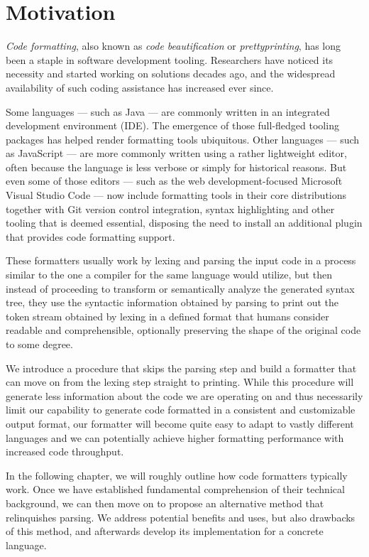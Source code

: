 \chapter{Motivation}
\textit{Code formatting}, also known as \textit{code beautification} or \textit{prettyprinting},
has long been a staple in software development tooling.
Researchers have noticed its necessity and started working on solutions decades ago,
\autocite{syntaxDirectedPrettyprinting}
and the widespread availability of such coding assistance has increased ever since.

Some languages --- such as Java --- are commonly written in an integrated development environment (IDE).
The emergence of those full-fledged tooling packages has helped render formatting tools ubiquitous.
Other languages --- such as JavaScript --- are more commonly written using a rather lightweight editor,
often because the language is less verbose or simply for historical reasons.
But even some of those editors --- such as the web development-focused Microsoft Visual Studio Code ---
now include formatting tools in their core distributions together with
Git version control integration, syntax highlighting and other tooling that is deemed essential,
disposing the need to install an additional plugin that provides code formatting support.

These formatters usually work by lexing and parsing the input code
in a process similar to the one a compiler for the same language would utilize,
but then instead of proceeding to transform or semantically analyze the generated syntax tree,
they use the syntactic information obtained by parsing
to print out the token stream obtained by lexing
in a defined format that humans consider readable and comprehensible,
optionally preserving the shape of the original code to some degree.

We introduce a procedure that skips the parsing step and
build a formatter that can move on from the lexing step straight to printing.
While this procedure will generate less information about the code we are operating on and
thus necessarily limit our capability to generate code
formatted in a consistent and customizable output format,
our formatter will become quite easy to adapt to vastly different languages and
we can potentially achieve higher formatting performance with increased code throughput.

In the following chapter, we will roughly outline how code formatters typically work.
Once we have established fundamental comprehension of their technical background,
we can then move on to propose an alternative method that relinquishes parsing.
We address potential benefits and uses, but also drawbacks of this method,
and afterwards develop its implementation for a concrete language.
